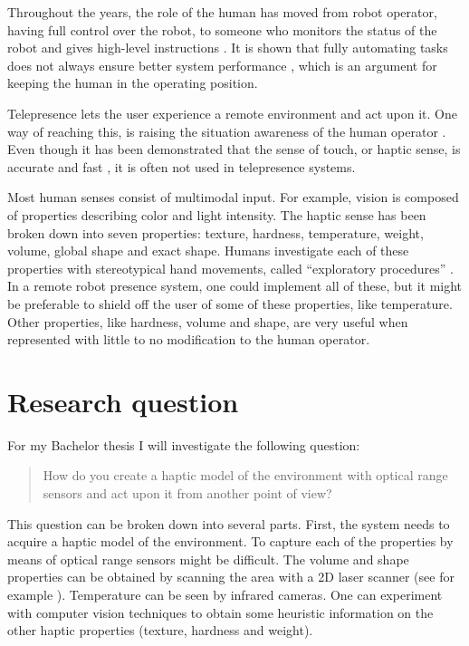 \documentclass[10pt, a4paper]{article}
\begin{document}
\begin{multicols}{2}
Throughout the years, the role of the human has moved from robot operator,
having full control over the robot, to someone who monitors the status of the
robot and gives high-level instructions \cite{VanErp2006}.  It is shown that
fully automating tasks does not always ensure better system performance
\cite{VanErp2000}, which is an argument for keeping the human in the operating
position.

Telepresence lets the user experience a remote environment and act upon it.
One way of reaching this, is raising the situation awareness of the human
operator \cite{Endsley1988,VanErp2006}.  Even though it has been demonstrated
that the sense of touch, or haptic sense, is accurate and fast
\cite{Klatzky1985}, it is often not used in telepresence systems.  


Most human senses consist of multimodal input. For example, vision is composed
of properties describing color and light intensity.  The haptic sense has been
broken down into seven properties: texture, hardness, temperature, weight,
volume, global shape and exact shape.  Humans investigate each of these
properties with stereotypical hand movements, called ``exploratory
procedures'' \cite{Lederman1993}.  In a remote robot presence system, one
could implement all of these, but it might be preferable to shield off the
user of some of these properties, like temperature.  Other properties, like
hardness, volume and shape, are very useful when represented with little to no
modification to the human operator.  

\section{Research question}
For my Bachelor thesis I will investigate the following question:
\begin{quote}
How do you create a haptic model of the environment with optical range sensors
and act upon it from another point of view?
\end{quote}

This question can be broken down into several parts.  First, the system needs
to acquire a haptic model of the environment.  To capture each of the
properties by means of optical range sensors might be difficult.  The volume
and shape properties can be obtained by scanning the area with a 2D laser
scanner (see for example \cite{Curless1996,Chen1996}).  Temperature can be seen by infrared cameras.
One can experiment with computer vision techniques to obtain some heuristic
information on the other haptic properties (texture, hardness and weight).


\end{multicols}
\end{document}
